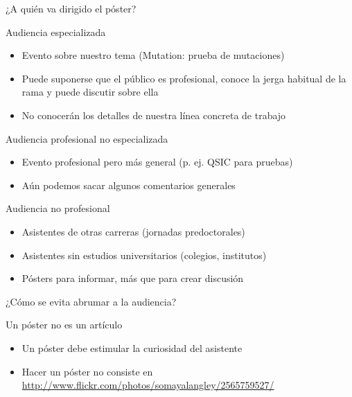 \documentclass[xcolor=svgnames,compress]{beamer}
\begin{document}
\begin{frame}{¿A quién va dirigido el póster?}

  \begin{block}{Audiencia especializada}
    \begin{itemize}
    \item Evento sobre nuestro tema (Mutation: prueba de mutaciones)
    \item Puede suponerse que el público es profesional, conoce la jerga
      habitual de la rama y puede discutir sobre ella
    \item No conocerán los detalles de nuestra línea concreta de trabajo
    \end{itemize}
  \end{block}

  \begin{block}{Audiencia profesional no especializada}
    \begin{itemize}
    \item Evento profesional pero más general (p. ej. QSIC para pruebas)
    \item Aún podemos sacar algunos comentarios generales
    \end{itemize}
  \end{block}

  \begin{block}{Audiencia no profesional}
    \begin{itemize}
    \item Asistentes de otras carreras (jornadas predoctorales)
    \item Asistentes sin estudios universitarios (colegios, institutos)
    \item Pósters para informar, más que para crear discusión
    \end{itemize}
  \end{block}

\end{frame}

\begin{frame}{¿Cómo se evita abrumar a la audiencia?}

  \begin{block}{Un póster no es un artículo}
    \begin{itemize}
    \item Un póster debe estimular la curiosidad del asistente
    \item Hacer un póster no consiste en \href{imprimir el
        artículo}{http://www.flickr.com/photos/somayalangley/2565759527/}
    \end{itemize}
  \end{block}

\end{frame}
\end{document}
